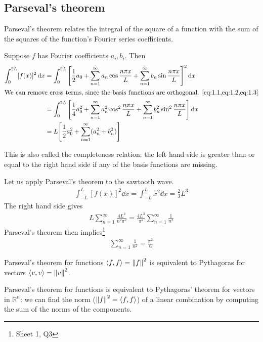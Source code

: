     \subsection{Parseval's theorem}
    Parseval's theorem relates the integral of the square of a function with the sum of the squares of the function's Fourier series coefficients.
    \begin{theorem}
        Suppose $f$ has Fourier coefficients $a_i, b_i$.
        Then
        \begin{align}
            \int_0^{2L} [f(x)]^2 \dd{x} & = \int_0^{2L} \qty[ \frac{1}{2}a_0 + \sum_{n=1}^\infty a_n \cos \frac{n \pi x}{L} + \sum_{n=1}^\infty b_n \sin \frac{n\pi x}{L} ]^2 \dd{x} \notag \\
            \intertext{We can remove cross terms, since the basis functions are orthogonal. \cref{eq:1.1,eq:1.2,eq:1.3}}
            & = \int_0^{2L} \qty[ \frac{1}{4} a_0^2 + \sum_{n=1}^\infty a_n^2 \cos^2 \frac{n\pi x}{L} + \sum_{n=1}^\infty b_n^2 \sin^2 \frac{n\pi x}{L} ] \dd{x} \notag \\
            & = L \qty[ \frac{1}{2} a_0^2 + \sum_{n=1}^\infty (a_n^2 + b_n^2) ]
        \end{align}
    \end{theorem}
    \noindent This is also called the completeness relation: the left hand side is greater than or equal to the right hand side if any of the basis functions are missing.
    \begin{example}
        Let us apply Parseval's theorem to the sawtooth wave.
        \begin{align*}
            \int_{-L}^L [f(x)]^2 \dd{x} = \int_{-L}^L x^2 \dd{x} = \frac{2}{3}L^3
        \end{align*}
        The right hand side gives
        \begin{align*}
            L \sum_{n=1}^\infty \frac{4L^2}{n^2 \pi^2} = \frac{4 L^3}{\pi^2} \sum_{n=1}^\infty \frac{1}{n^2}
        \end{align*}
        Parseval's theorem then implies\footnote{Sheet 1, Q3}
        \begin{align*}
            \sum_{n=1}^\infty \frac{1}{n^2} = \frac{\pi^2}{6}
        \end{align*}
    \end{example}
    \begin{note}
        Parseval's theorem for functions $\left\langle{f, f}\right\rangle = \left \lVert f \right \rVert^2$ is equivalent to Pythagoras for vectors $\left\langle{v, v}\right\rangle = \left \lVert v \right \rVert^2$.
    \end{note} 
    \begin{remark}
        Parseval's theorem for functions is equivalent to Pythagoras' theorem for vectors in $\mathbb R^n$: we can find the norm ($\left \lVert f \right \rVert^2 = \left\langle{f, f}\right\rangle$) of a linear combination by computing the sum of the norms of the components.
    \end{remark}

